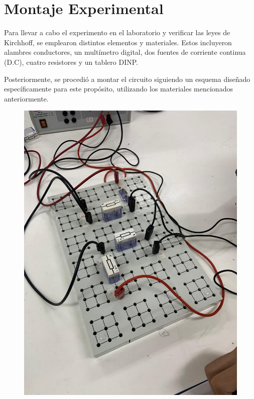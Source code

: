 \documentclass[twocolumn, 12pt]{article}
\begin{document}
\section{Montaje Experimental}

Para llevar a cabo el experimento en el laboratorio y
verificar las leyes de Kirchhoff, se emplearon distintos
elementos y materiales. Estos incluyeron alambres
conductores, un multímetro digital, dos fuentes de
corriente continua (D.C), cuatro resistores y un tablero
DINP\@.

Posteriormente, se procedió a montar el circuito siguiendo
un esquema diseñado específicamente para este propósito,
utilizando los materiales mencionados anteriormente.

\begin{figure}[H]
    \centering
    \includegraphics[width = 0.9\linewidth]{./Images/Imagen3.jpeg}
\end{figure}
\end{document}

